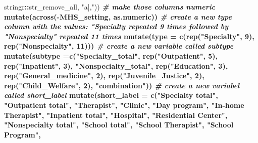 \documentclass[
]{article}
\newenvironment{Shaded}{\begin{snugshade}}{\end{snugshade}}
\newcommand{\CommentTok}[1]{\textcolor[rgb]{0.56,0.35,0.01}{\textit{#1}}}
\newcommand{\DataTypeTok}[1]{\textcolor[rgb]{0.13,0.29,0.53}{#1}}
\newcommand{\DecValTok}[1]{\textcolor[rgb]{0.00,0.00,0.81}{#1}}
\newcommand{\KeywordTok}[1]{\textcolor[rgb]{0.13,0.29,0.53}{\textbf{#1}}}
\newcommand{\NormalTok}[1]{#1}
\newcommand{\OperatorTok}[1]{\textcolor[rgb]{0.81,0.36,0.00}{\textbf{#1}}}
\newcommand{\StringTok}[1]{\textcolor[rgb]{0.31,0.60,0.02}{#1}}
\begin{document}
\begin{Shaded}
\begin{Highlighting}[]
{{{{{{{{{{\NormalTok{                stringr}\OperatorTok{::}\NormalTok{str_remove_all, }\StringTok{"a|,"}\NormalTok{)) }\OperatorTok{%>%}
\CommentTok{# make those columns numeric}
\StringTok{  }\KeywordTok{mutate}\NormalTok{(}\KeywordTok{across}\NormalTok{(}\OperatorTok{-}\NormalTok{MHS_setting, as.numeric)) }\OperatorTok{%>%}
\CommentTok{# create a new type column with the values: "Specialty repeated 9 times followed by "Nonspecialty" repeated 11 times}
\StringTok{  }\KeywordTok{mutate}\NormalTok{(}\DataTypeTok{type =} \KeywordTok{c}\NormalTok{(}\KeywordTok{rep}\NormalTok{(}\StringTok{"Specialty"}\NormalTok{, }\DecValTok{9}\NormalTok{), }\KeywordTok{rep}\NormalTok{(}\StringTok{"Nonspecialty"}\NormalTok{, }\DecValTok{11}\NormalTok{))) }\OperatorTok{%>%}
\CommentTok{# create a new variable called subtype }
\StringTok{  }\KeywordTok{mutate}\NormalTok{(}\DataTypeTok{subtype =}\KeywordTok{c}\NormalTok{(}\StringTok{"Specialty_total"}\NormalTok{, }
                    \KeywordTok{rep}\NormalTok{(}\StringTok{"Outpatient"}\NormalTok{, }\DecValTok{5}\NormalTok{), }
                    \KeywordTok{rep}\NormalTok{(}\StringTok{"Inpatient"}\NormalTok{, }\DecValTok{3}\NormalTok{), }
                    \StringTok{"Nonspecialty_total"}\NormalTok{, }
                    \KeywordTok{rep}\NormalTok{(}\StringTok{"Education"}\NormalTok{, }\DecValTok{3}\NormalTok{), }
                    \KeywordTok{rep}\NormalTok{(}\StringTok{"General_medicine"}\NormalTok{, }\DecValTok{2}\NormalTok{),}
                    \KeywordTok{rep}\NormalTok{(}\StringTok{"Juvenile_Justice"}\NormalTok{, }\DecValTok{2}\NormalTok{),}
                    \KeywordTok{rep}\NormalTok{(}\StringTok{"Child_Welfare"}\NormalTok{, }\DecValTok{2}\NormalTok{), }
                    \StringTok{"combination"}\NormalTok{)) }\OperatorTok{%>%}
\CommentTok{# create a new variabel called short_label}
\StringTok{  }\KeywordTok{mutate}\NormalTok{(}\DataTypeTok{short_label =} \KeywordTok{c}\NormalTok{(}\StringTok{"Specialty total"}\NormalTok{, }\StringTok{"Outpatient total"}\NormalTok{,}
                         \StringTok{"Therapist"}\NormalTok{, }\StringTok{"Clinic"}\NormalTok{, }\StringTok{"Day program"}\NormalTok{, }
                         \StringTok{"In-home Therapist"}\NormalTok{, }\StringTok{"Inpatient total"}\NormalTok{,}
                         \StringTok{"Hospital"}\NormalTok{, }\StringTok{"Residential Center"}\NormalTok{,}
                         \StringTok{"Nonspecialty total"}\NormalTok{, }\StringTok{"School total"}\NormalTok{, }
                         \StringTok{"School Therapist"}\NormalTok{, }\StringTok{"School Program"}\NormalTok{, }
}}}}}}}}}}}}}}
\end{Highlighting}
\end{Shaded}
\end{document}
